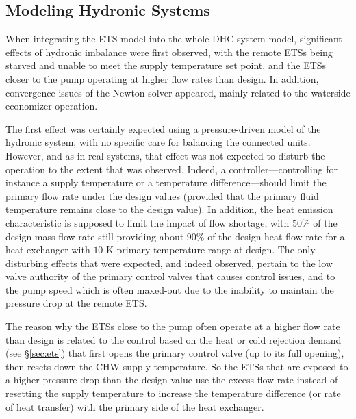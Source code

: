 \pagebreak
\begin{appendix}

\section{Modeling Hydronic Systems} \label{sec:balancing}

When integrating the ETS model into the whole DHC system model, significant effects of hydronic imbalance were first observed, with the remote ETSs being starved and unable to meet the supply temperature set point, and the ETSs closer to the pump operating at higher flow rates than design.
In addition, convergence issues of the Newton solver appeared, mainly related to the waterside economizer operation.

The first effect was certainly expected using a pressure-driven model of the hydronic system, with no specific care for balancing the connected units. However, and as in real systems, that effect was not expected to disturb the operation to the extent that was observed. Indeed, a controller---controlling for instance a supply temperature or a temperature difference---should limit the primary flow rate under the design values (provided that the primary fluid temperature remains close to the design value). In addition, the heat emission characteristic is supposed to limit the impact of flow shortage, with $50\%$ of the design mass flow rate still providing about $90\%$ of the design heat flow rate for a heat exchanger with $10$ K primary temperature range at design. The only disturbing effects that were expected, and indeed observed, pertain to the low valve authority of the primary control valves that causes control issues, and to the pump speed which is often maxed-out due to the inability to maintain the pressure drop at the remote ETS.

The reason why the ETSs close to the pump often operate at a higher flow rate than design is related to the control based on the heat or cold rejection demand (see §\ref{sec:ets}) that first opens the primary control valve (up to its full opening), then resets down the CHW supply temperature. So the ETSs that are exposed to a higher pressure drop than the design value use the excess flow rate instead of resetting the supply temperature to increase the temperature difference (or rate of heat transfer) with the primary side of the heat exchanger.


\end{appendix}
